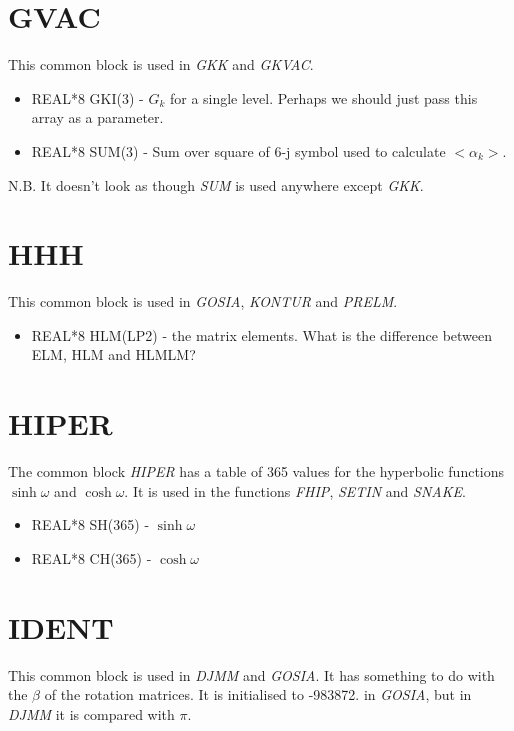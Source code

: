 \section{GVAC}

This common block is used in \emph{GKK} and \emph{GKVAC}.

\begin{itemize}
\item REAL*8 GKI(3) - $G_k$ for a single level. Perhaps we should just pass
this array as a parameter.
\item REAL*8 SUM(3) - Sum over square of 6-j symbol used to calculate
$<\alpha_k>$.
\end{itemize}

N.B. It doesn't look as though \emph{SUM} is used anywhere except \emph{GKK}.

\section{HHH}

This common block is used in \emph{GOSIA}, \emph{KONTUR} and \emph{PRELM}.

\begin{itemize}
\item REAL*8 HLM(LP2) - the matrix elements. What is the difference between
ELM, HLM and HLMLM?
\end{itemize}

\section{HIPER}

The common block \emph{HIPER} has a table of 365 values for the hyperbolic
functions $\sinh\omega$ and $\cosh\omega$. It is used in the functions \emph{
FHIP}, \emph{SETIN} and \emph{SNAKE}.

\begin{itemize}
\item REAL*8 SH(365) - $\sinh\omega$
\item REAL*8 CH(365) - $\cosh\omega$
\end{itemize}

\section{IDENT}

This common block is used in \emph{DJMM} and \emph{GOSIA}. It has something to
do with the $\beta$ of the rotation matrices. It is initialised to -983872.
in \emph{GOSIA}, but in \emph{DJMM} it is compared with $\pi$.

